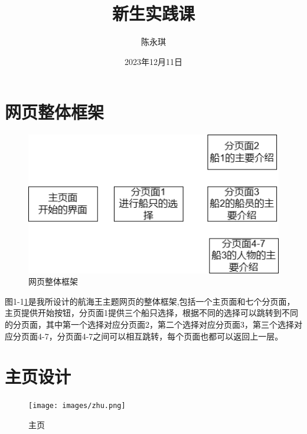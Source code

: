 \documentclass[supercite]{Experimental_Report}
\title{~~~~~~新生实践课~~~~~~}
\author{陈永琪}
\date{2023年12月11日}
\theoremstyle{definition}
\begin{document}
\maketitle

\clearpage


\tableofcontents[level=2]

\clearpage


\section{网页整体框架}

\begin{figure}[htb] %
	\begin{center}
		\includegraphics[scale=0.80]{images/drawio.png}
		\caption{网页整体框架}
		\label{fig1-1}
	\end{center}
\end{figure}
图1-1\ref{fig1-1}是我所设计的航海王主题网页的整体框架,包括一个主页面和七个分页面，主页提供开始按钮，分页面1提供三个船只选择，根据不同的选择可以跳转到不同的分页面，其中第一个选择对应分页面2，第二个选择对应分页面3，第三个选择对应分页面4-7，分页面4-7之间可以相互跳转，每个页面也都可以返回上一层。

\newpage

\section{主页设计}



\begin{figure}[htb]
	\begin{center}
		\texttt{[image: images/zhu.png]}
		\caption{主页}
		\label{fig2-1}
	\end{center}
\end{figure}
\end{document}
